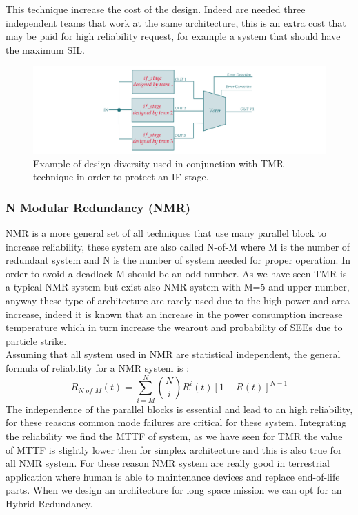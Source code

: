 {{{{{        		    This technique increase the cost of the design. Indeed are needed three independent teams that work at the same architecture, this is an extra cost that may be paid for high reliability request, for example a system that should have the maximum SIL. 
            		
            		\begin{figure}[H]
            			\centering
            			\includegraphics[scale=0.2,center]{./images/TMR_Design_Diversity.png}
            			\caption{Example of design diversity used in conjunction with TMR technique in order to protect an IF stage.}
            			\label{fig:TMR5}
            		\end{figure} 
            		
        		}
		    }
		    \subsubsection{N Modular Redundancy (NMR)}{
		        NMR is a more general set of all techniques that use many parallel block to increase reliability, these system are also called N-of-M where M is the number of redundant system and N is the number of system needed for proper operation. 
		        In order to avoid a deadlock M should be an odd number. As we have seen TMR is a typical NMR system but exist also NMR system with M=5 and upper number, anyway these type of architecture are rarely used due to the high power and area increase, indeed it is known that an increase in the power consumption increase temperature which in turn increase the wearout and probability of SEEs due to particle strike. \\
		        
		        Assuming that all system used in NMR are statistical independent, the general formula of reliability for a NMR system is :
		        \begin{equation}
		            \label{eq:R_NMR}
		            R_{N\,\,of\,\,M}(t) = \sum_{i=M}^N \binom{N}{i} R^i(t) [ 1- R(t)]^{N-1}
		        \end{equation}
		        The independence of the parallel blocks is essential and lead to an high reliability, for these reasons common mode failures are critical for these system. 
		        Integrating the reliability we find the MTTF of system, as we have seen for TMR the value of MTTF is slightly lower then for simplex architecture and this is also true for all NMR system. 
		        For these reason NMR system are really good in terrestrial application where human is able to maintenance devices and replace end-of-life parts. When we design an architecture for long space mission we can opt for an Hybrid Redundancy.\\
		        
}}}}
